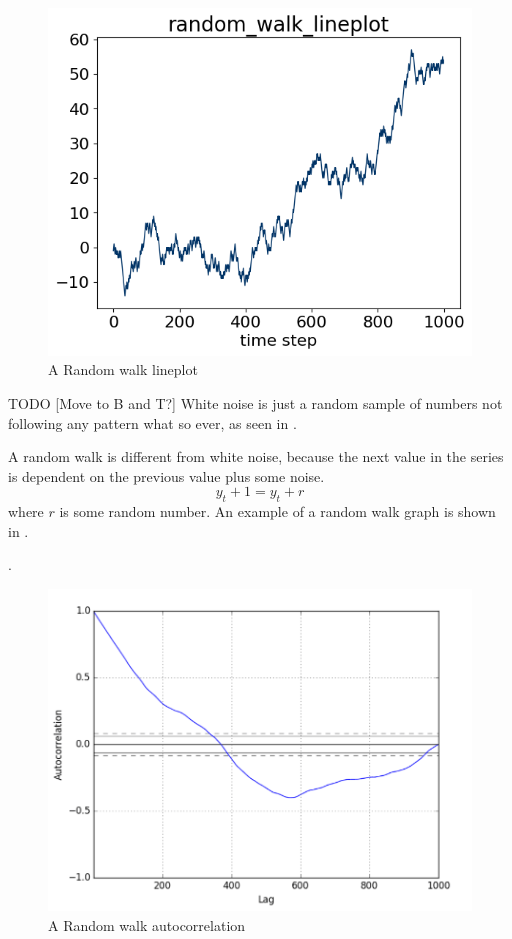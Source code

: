 \begin{figure}[h!]
  \centering
  \includegraphics[width=\textwidth]{./figs/code_generated/data_exploration/random_walk_lineplot.png}
  \hfill
  \caption{A Random walk lineplot}
  \label{fig:dataset:random_walk}
\end{figure}

TODO [Move to B and T?]
White noise is just a random sample of numbers not following any pattern what so ever, as seen in
.

A random walk is different from white noise, because the next value in the series is dependent on the previous value plus some noise.
\begin{equation}
  y_t+1 = y_t + r
  \label{eq:random_walk}
\end{equation}
where $r$ is some random number.
An example of a random walk graph is shown in .

.
\begin{figure}[h!]
  \centering
  \includegraphics[width=\textwidth]{./figs/illustrations/random_walk_autocorrelation.png}
  \hfill
  \caption{A Random walk autocorrelation}
  \label{fig:dataset:random_walk_autocorrelation}
\end{figure}

